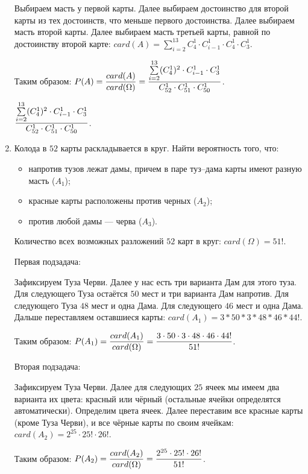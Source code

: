 \documentclass{article}
\begin{document}
\begin{enumerate}
    Выбираем масть у первой карты. Далее выбираем достоинство для второй карты из тех достоинств, что меньше первого достоинства. Далее выбираем масть второй карты. Далее выбираем масть третьей карты, равной по достоинству второй карте: $card(A) = \sum\limits_{i = 2}^{13}  C_4^1 \cdot C_{i - 1}^1 \cdot C_4^1 \cdot C_3^1$.

    Таким образом: $\displaystyle{P(A) = \frac{card(A)}{card(\Omega)} = \frac{\sum\limits_{i = 2}^{13}  (C_4^1) ^ 2 \cdot C_{i - 1}^1 \cdot C_3^1}{C_{52}^1 \cdot C_{51}^1 \cdot C_{50}^1}}$.
    
    \answer{} $\displaystyle{\frac{\sum\limits_{i = 2}^{13}  (C_4^1) ^ 2 \cdot C_{i - 1}^1 \cdot C_3^1}{C_{52}^1 \cdot C_{51}^1 \cdot C_{50}^1}}$.

    \item Колода в $52$ карты раскладывается в круг. Найти вероятность того, что:
    \begin{itemize}
        \item напротив тузов лежат дамы, причем в паре туз–дама карты имеют разную масть ($A_1$);
        \item красные карты расположены против черных ($A_2$);
        \item против любой дамы — черва ($A_3$).
    \end{itemize}

    \solution{}

    Количество всех возможных разложений $52$ карт в круг: $card(\Omega) = 51!$.
    
    Первая подзадача:

    Зафиксируем Туза Черви. Далее у нас есть три варианта Дам для этого туза. Для следующего Туза остаётся $50$ мест и три варианта Дам напротив. Для следующего Туза $48$ мест и одна Дама. Для следующего $46$ мест и одна Дама. Дальше переставляем оставшиеся карты: $card(A_1) = 3 * 50 * 3 * 48 * 46 * 44!$.

    Таким образом: $\displaystyle{P(A_1) = \frac{card(A_1)}{card(\Omega)} = \frac{3 \cdot 50 \cdot 3 \cdot 48 \cdot 46 \cdot 44!}{51!}}$.

    Вторая подзадача:

    Зафиксируем Туза Черви. Далее для следующих $25$ ячеек мы имеем два варианта их цвета: красный или чёрный (остальные ячейки определятся автоматически). Определим цвета ячеек. Далее переставим все красные карты (кроме Туза Черви), и все чёрные карты по своим ячейкам: $card(A_2) = 2^{25} \cdot 25! \cdot 26!$.

    Таким образом: $\displaystyle{P(A_2) = \frac{card(A_2)}{card(\Omega)} = \frac{2^{25} \cdot 25! \cdot 26!}{51!}}$.


\end{enumerate}
\end{document}
